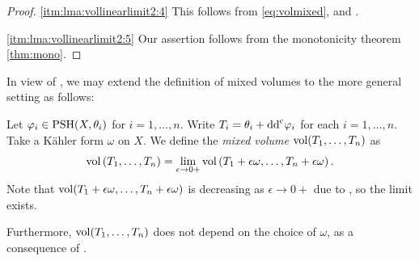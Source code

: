 \begin{proof}
    \ref{itm:lma:vollinearlimit2:4} This follows from \eqref{eq:volmixed},  and .

    \ref{itm:lma:vollinearlimit2:5} Our assertion follows from the monotonicity theorem \cref{thm:mono}.
\end{proof}

In view of , we may extend the definition of mixed volumes to the more general setting as follows:
\begin{definition}\label{def:mix_vol}
    Let $\varphi_i\in \mathrm{PSH}(X,\theta_i)$ for $i=1,\ldots,n$. Write $T_i=\theta_i+\mathrm{dd}^{\mathrm{c}} \varphi_i$ for each $i=1,\ldots,n$. Take a Kähler form $\omega$ on $X$. We define the \emph{mixed volume} $\operatorname{vol}(T_1,\ldots,T_n)$ as
        \begin{equation}\label{eq:volmixedgeneral}
            \operatorname{vol}\left(T_1,\ldots,T_n\right)=\lim_{\epsilon\to 0+}\operatorname{vol}\left(T_1+\epsilon\omega,\ldots,T_n+\epsilon\omega\right).
        \end{equation}
    Note that $\operatorname{vol}(T_1+\epsilon\omega,\ldots,T_n+\epsilon\omega)$ is decreasing as $\epsilon \to 0+$ due to , so the limit exists.

    Furthermore, $\operatorname{vol}(T_1,\ldots,T_n)$ does not depend on the choice of $\omega$, as a consequence of .
\end{definition}




